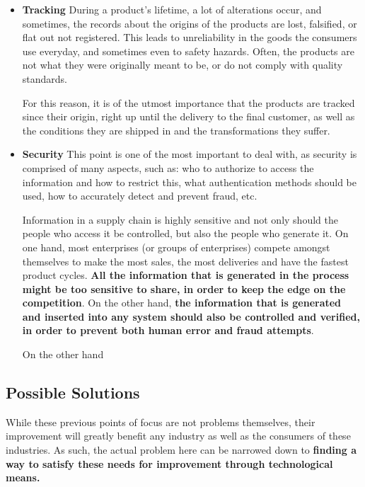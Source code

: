 \begin{itemize}
\item \textbf{Tracking}
During a product's lifetime, a lot of alterations occur, and sometimes, the records about the origins of the products are lost, falsified, or flat out not registered. This leads to unreliability in the goods the consumers use everyday, and sometimes even to safety hazards. Often, the products are not what they were originally meant to be, or do not comply with quality standards.

For this reason, it is of the utmost importance that the products are tracked since their origin, right up until the delivery to the final customer, as well as the conditions they are shipped in and the transformations they suffer.

\item \textbf{Security}
This point is one of the most important to deal with, as security is comprised of many aspects, such as: who to authorize to access the information and how to restrict this, what authentication methods should be used, how to accurately detect and prevent fraud, etc. 

Information in a supply chain is highly sensitive and not only should the people who access it be controlled, but also the people who generate it. On one hand, most enterprises (or groups of enterprises) compete amongst themselves to make the most sales, the most deliveries and have the fastest product cycles. \textbf{All the information that is generated in the process might be too sensitive to share, in order to keep the edge on the competition}.
On the other hand, \textbf{the information that is generated and inserted into any system should also be controlled and verified, in order to prevent both human error and fraud attempts}.

On the other hand
\end{itemize}

\subsection{Possible Solutions}
While these previous points of focus are not problems themselves, their improvement will greatly benefit any industry as well as the consumers of these industries. As such, the actual problem here can be narrowed down to \textbf{finding a way to satisfy these needs for improvement through technological means.}

